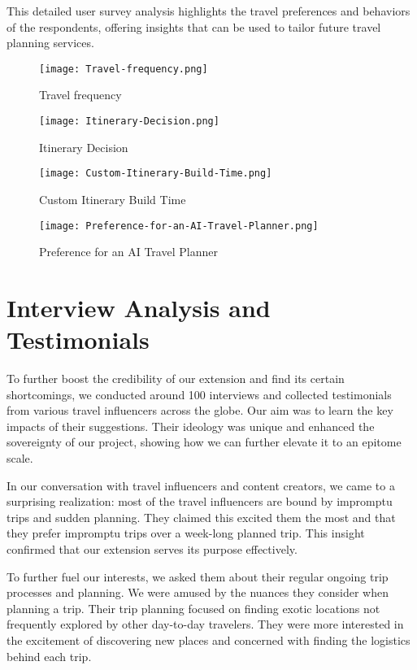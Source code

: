 \documentclass[sigconf,authordraft]{acmart}
\begin{document}
This detailed user survey analysis highlights the travel preferences and behaviors of the respondents, offering insights that can be used to tailor future travel planning services.

\begin{figure}
    \centering
    \texttt{[image: Travel-frequency.png]}
    \caption{Travel frequency}
    \label{fig:enter-label}
\end{figure}
\begin{figure}
    \centering
    \texttt{[image: Itinerary-Decision.png]}
    \caption{Itinerary Decision}
    \label{fig:enter-label}
    \end{figure}
\begin{figure}
    \centering
    \texttt{[image: Custom-Itinerary-Build-Time.png]}
    \caption{Custom Itinerary Build Time}
    \label{fig:enter-label}
    \end{figure}
\begin{figure}
    \centering
    \texttt{[image: Preference-for-an-AI-Travel-Planner.png]}
    \caption{Preference for an AI Travel Planner}
    \label{fig:enter-label}
\end{figure}


\section{Interview Analysis and Testimonials}

    To further boost the credibility of our extension and find its certain shortcomings, we conducted around 100 interviews and collected testimonials from various travel influencers across the globe. Our aim was to learn the key impacts of their suggestions. Their ideology was unique and enhanced the sovereignty of our project, showing how we can further elevate it to an epitome scale.
    
    In our conversation with travel influencers and content creators, we came to a surprising realization: most of the travel influencers are bound by impromptu trips and sudden planning. They claimed this excited them the most and that they prefer impromptu trips over a week-long planned trip. This insight confirmed that our extension serves its purpose effectively.
    
    To further fuel our interests, we asked them about their regular ongoing trip processes and planning. We were amused by the nuances they consider when planning a trip. Their trip planning focused on finding exotic locations not frequently explored by other day-to-day travelers. They were more interested in the excitement of discovering new places and concerned with finding the logistics behind each trip.
    
\end{document}
